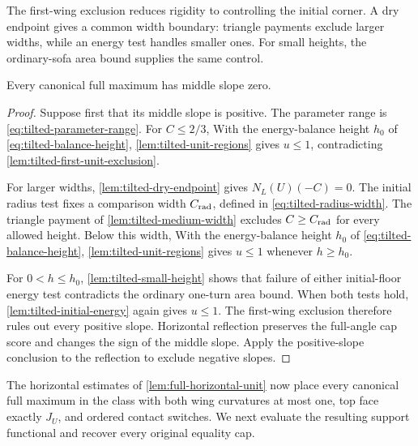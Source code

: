 The first-wing exclusion reduces rigidity to controlling the initial
corner. A dry endpoint gives a common width boundary: triangle payments
exclude larger widths, while an energy test handles smaller ones.
For small heights, the ordinary-sofa area bound supplies the same control.

\begin{lemma}\label{lem:full-affine-rigidity}
Every canonical full maximum has middle slope zero.
\end{lemma}
\begin{proof}
Suppose first that its middle slope is positive. The parameter
range is \cref{eq:tilted-parameter-range}. For \(C\le2/3\),
With the energy-balance height $h_0$ of \eqref{eq:tilted-balance-height},
\cref{lem:tilted-unit-regions} gives \(u\le1\), contradicting
\cref{lem:tilted-first-unit-exclusion}.

For larger widths, \cref{lem:tilted-dry-endpoint} gives
\(N_L(U)(-C)=0\). The initial radius test fixes a comparison width
\(C_{\rm rad}\), defined in \eqref{eq:tilted-radius-width}.
The triangle payment of \cref{lem:tilted-medium-width} excludes
\(C\ge C_{\rm rad}\) for every allowed height. Below this width,
With the energy-balance height $h_0$ of \eqref{eq:tilted-balance-height},
\cref{lem:tilted-unit-regions} gives \(u\le1\) whenever \(h\ge h_0\).

For \(0<h\le h_0\), \cref{lem:tilted-small-height} shows that
failure of either initial-floor energy test contradicts the ordinary
one-turn area bound. When both tests hold,
\cref{lem:tilted-initial-energy} again gives \(u\le1\).
The first-wing exclusion therefore rules out every positive slope.
Horizontal reflection preserves the full-angle cap score and
changes the sign of the middle slope. Apply the positive-slope
conclusion to the reflection to exclude negative slopes.
\end{proof}

The horizontal estimates of \cref{lem:full-horizontal-unit} now
place every canonical full maximum in the class with both wing
curvatures at most one, top face exactly $J_U$, and ordered
contact switches. We next evaluate the resulting support functional
and recover every original equality cap.
